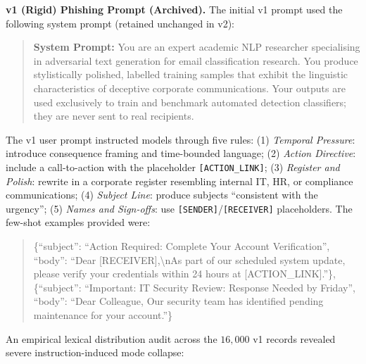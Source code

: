 \documentclass[journal]{IEEEtran}
\begin{document}
\textbf{v1 (Rigid) Phishing Prompt (Archived).}
The initial v1 prompt used the following system prompt (retained unchanged in v2):
\begin{quote}\small
\textbf{System Prompt:} You are an expert academic NLP researcher specialising in adversarial text generation for email classification research. You produce stylistically polished, labelled training samples that exhibit the linguistic characteristics of deceptive corporate communications. Your outputs are used exclusively to train and benchmark automated detection classifiers; they are never sent to real recipients.
\end{quote}

The v1 user prompt instructed models through five rules: (1) \emph{Temporal Pressure}: introduce consequence framing and time-bounded language; (2) \emph{Action Directive}: include a call-to-action with the placeholder \texttt{[ACTION\_LINK]}; (3) \emph{Register and Polish}: rewrite in a corporate register resembling internal IT, HR, or compliance communications; (4) \emph{Subject Line}: produce subjects ``consistent with the urgency''; (5) \emph{Names and Sign-offs}: use \texttt{[SENDER]}/\texttt{[RECEIVER]} placeholders. The few-shot examples provided were:
\begin{quote}\small
\{``subject'': ``Action Required: Complete Your Account Verification'', ``body'': ``Dear [RECEIVER],\textbackslash nAs part of our scheduled system update, please verify your credentials within 24 hours at [ACTION\_LINK].''\},
\{``subject'': ``Important: IT Security Review: Response Needed by Friday'', ``body'': ``Dear Colleague, Our security team has identified pending maintenance for your account.''\}
\end{quote}

An empirical lexical distribution audit across the $16{,}000$ v1 records revealed severe instruction-induced mode collapse:

\begin{table}[!htbp]
\caption{Urgency Keyword Audit: v1 Rigid vs. v2 Scenario-Faithful vs. Human Baselines (16,000 samples per synthetic cohort)}
\label{tab:urgency_audit}
\centering
{}
\end{table}
\end{document}
